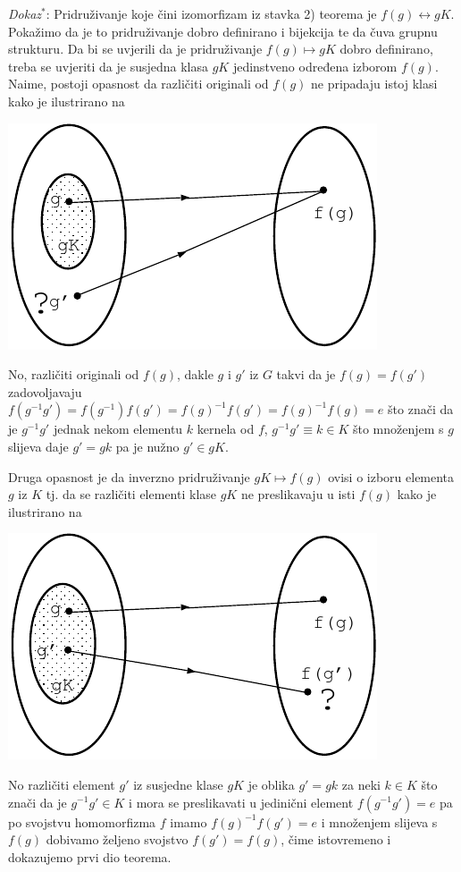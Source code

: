\emph{Dokaz}$^{*}$: Pridruživanje koje
čini izomorfizam iz stavka 2) teorema je $f(g)\leftrightarrow gK$.
Pokažimo da je to pridruživanje dobro definirano i bijekcija te da čuva grupnu
strukturu.
Da bi se uvjerili da je pridruživanje $f(g)\mapsto gK$ dobro definirano, treba
se uvjeriti da je susjedna klasa $gK$ jedinstveno određena izborom $f(g)$. Naime,
postoji opasnost da različiti originali od $f(g)$ ne pripadaju istoj klasi
kako je ilustrirano na\\[2ex]
\vspace*{3ex}
\centerline{\includegraphics[scale=0.8]{pics/homo1}}
No, različiti originali od $f(g)$, dakle $g$ i $g'$ iz $G$
takvi da je  $f(g)=f(g')$ zadovoljavaju
$f(g^{-1} g')=f(g^{-1})f(g')=f(g)^{-1}f(g')=f(g)^{-1}f(g)=e$ što  znači
da je $g^{-1} g'$ jednak nekom elementu $k$ kernela od $f$,
$g^{-1} g' \equiv k\in K$ što množenjem s $g$ slijeva
daje $g'=gk$ pa je nužno $g' \in gK$.


Druga opasnost je da inverzno pridruživanje
$gK\mapsto f(g)$ ovisi o izboru elementa $g$ iz $K$ tj. da
se različiti elementi klase $gK$ ne preslikavaju u isti $f(g)$
kako je ilustrirano na\\[2ex]
\vspace*{3ex}
\centerline{\includegraphics[scale=0.8]{pics/homo2}}
No različiti element $g'$ iz susjedne klase $gK$ je oblika $g'=gk$ za neki
$k\in K$ što znači da je $g^{-1} g'\in K$ i mora se preslikavati
u jedinični element
$f(g^{-1}g')=e$ pa po svojstvu homomorfizma $f$ imamo 
$f(g)^{-1}f(g')=e$ i množenjem slijeva s $f(g)$ dobivamo željeno
svojstvo $f(g')=f(g)$, čime istovremeno i dokazujemo prvi dio teorema.

